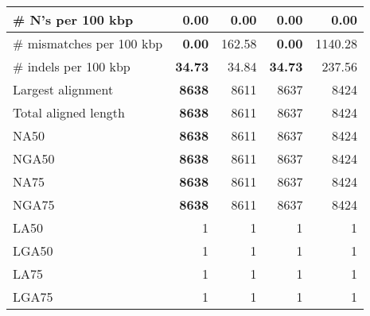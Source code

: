 \documentclass[12pt,a4paper]{article}
\begin{document}
\begin{table}[ht]
\begin{center}
\begin{tabular}{|l*{4}{|r}|}
\# N's per 100 kbp & 0.00 & 0.00 & 0.00 & 0.00 \\ \hline
\# mismatches per 100 kbp & {\bf 0.00} & 162.58 & {\bf 0.00} & 1140.28 \\ \hline
\# indels per 100 kbp & {\bf 34.73} & 34.84 & {\bf 34.73} & 237.56 \\ \hline
Largest alignment & {\bf 8638} & 8611 & 8637 & 8424 \\ \hline
Total aligned length & {\bf 8638} & 8611 & 8637 & 8424 \\ \hline
NA50 & {\bf 8638} & 8611 & 8637 & 8424 \\ \hline
NGA50 & {\bf 8638} & 8611 & 8637 & 8424 \\ \hline
NA75 & {\bf 8638} & 8611 & 8637 & 8424 \\ \hline
NGA75 & {\bf 8638} & 8611 & 8637 & 8424 \\ \hline
LA50 & 1 & 1 & 1 & 1 \\ \hline
LGA50 & 1 & 1 & 1 & 1 \\ \hline
LA75 & 1 & 1 & 1 & 1 \\ \hline
LGA75 & 1 & 1 & 1 & 1 \\ \hline
\end{tabular}
\end{center}
\end{table}
\end{document}
